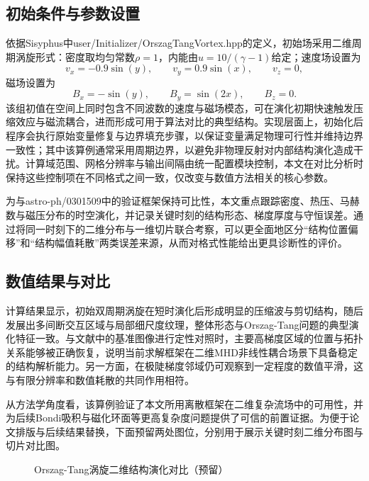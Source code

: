 \subsection{初始条件与参数设置}
依据Sisyphus中user/Initializer/OrszagTangVortex.hpp的定义，初始场采用二维周期涡旋形式：密度取均匀常数$\rho=1$，内能由$u=10/(\gamma-1)$给定；速度场设置为
\[
v_x=-0.9\sin(y),\qquad v_y=0.9\sin(x),\qquad v_z=0,
\]
磁场设置为
\[
B_x=-\sin(y),\qquad B_y=\sin(2x),\qquad B_z=0.
\]
该组初值在空间上同时包含不同波数的速度与磁场模态，可在演化初期快速触发压缩效应与磁流耦合，进而形成可用于算法对比的典型结构。实现层面上，初始化后程序会执行原始变量修复与边界填充步骤，以保证变量满足物理可行性并维持边界一致性；其中该算例通常采用周期边界，以避免非物理反射对内部结构演化造成干扰。计算域范围、网格分辨率与输出间隔由统一配置模块控制，本文在对比分析时保持这些控制项在不同格式之间一致，仅改变与数值方法相关的核心参数。

为与astro-ph/0301509中的验证框架保持可比性，本文重点跟踪密度、热压、马赫数与磁压分布的时空演化，并记录关键时刻的结构形态、梯度厚度与守恒误差。通过将同一时刻下的二维分布与一维切片联合考察，可以更全面地区分“结构位置偏移”和“结构幅值耗散”两类误差来源，从而对格式性能给出更具诊断性的评价。

\subsection{数值结果与对比}
计算结果显示，初始双周期涡旋在短时演化后形成明显的压缩波与剪切结构，随后发展出多间断交互区域与局部细尺度纹理，整体形态与Orszag-Tang问题的典型演化特征一致。与文献中的基准图像进行定性对照时，主要高梯度区域的位置与拓扑关系能够被正确恢复，说明当前求解框架在二维MHD非线性耦合场景下具备稳定的结构解析能力。另一方面，在极陡梯度邻域仍可观察到一定程度的数值平滑，这与有限分辨率和数值耗散的共同作用相符。

从方法学角度看，该算例验证了本文所用离散框架在二维复杂流场中的可用性，并为后续Bondi吸积与磁化环面等更高复杂度问题提供了可信的前置证据。为便于论文排版与后续结果替换，下面预留两处图位，分别用于展示关键时刻二维分布图与切片对比图。

\begin{figure}[htbp]
	\centering
	\caption{Orszag-Tang涡旋二维结构演化对比（预留）}
	\label{fig:ot-2d-placeholder}
\end{figure}

